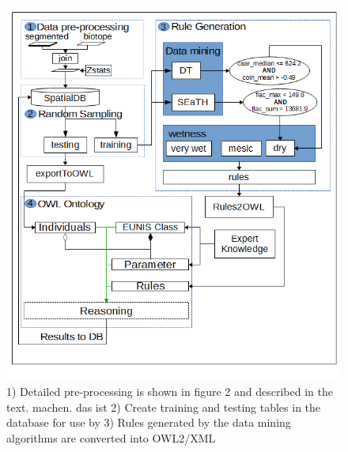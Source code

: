 \documentclass[authoryear, review,12pt,number]{elsarticle}
\begin{document}
\begin{figure}
    \includegraphics[width=1\linewidth]{diagrams/another_workflow_diagram_large.png}
    \caption{1) Detailed pre-processing is shown in figure 2 and described in
        the text.%
        machen. das ist
    2) Create training and testing tables in the database for use by 3)  Rules
generated by the data mining algorithms are converted into OWL2/XML }
\label{fig_full_workflow} \end{figure}
\end{document}
